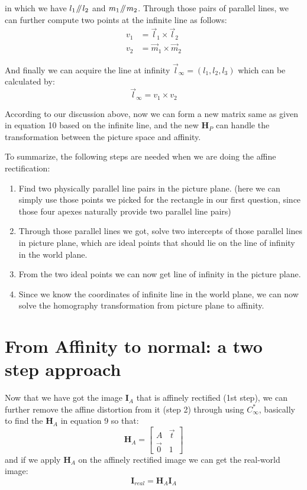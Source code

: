 \documentclass[conference]{IEEEtran}
\let\oldvec\vec
\renewcommand{\vec}[1]{\oldvec{\mathit{#1}}}
\newcommand{\mat}[1]{\mathbf{#1}} %
\newcommand{\parallelsum}{\mathbin{\!/\mkern-5mu/\!}}
\begin{document}
\noindent in which we have $l_1\parallelsum l_2$ and $m_1\parallelsum m_2$. Through those pairs of parallel lines, we can further compute two points at the infinite line as follows:
\begin{equation}
\begin{split}
	v_1 &= \vec{l}_1\times \vec{l}_2\\
	v_2 &= \vec{m}_1 \times \vec{m}_2
\end{split}
\end{equation}

\noindent And finally we can acquire the line at infinity $\vec{l}_{\infty} = (l_1, l_2, l_3)$ which can be calculated by:
\begin{equation}
	\vec{l}_{\infty} = v_1 \times v_2
\end{equation}

\noindent According to our discussion above, now we can form a new matrix same as given in equation 10 based on the infinite line, and the new $\mat{H}_P$ can handle the transformation between the picture space and affinity.

To summarize, the following steps are needed when we are doing the affine rectification:
\begin{enumerate}
	\item Find two physically parallel line pairs in the picture plane. (here we can simply use those points we picked for the rectangle in our first question, since those four apexes naturally provide two parallel line pairs)
	\item Through those parallel lines we got, solve two intercepts of those parallel lines in picture plane, which are ideal points that should lie on the line of infinity in the world plane.
	\item From the two ideal points we can now get line of infinity in the picture plane.
	\item Since we know the coordinates of infinite line in the world plane, we can now solve the homography transformation from picture plane to affinity.
\end{enumerate}

\section{From Affinity to normal: a two step approach}
Now that we have got the image $\mat{I}_A$ that is affinely rectified (1st step), we can further remove the affine distortion from it (step 2) through using $C_{\infty}^*$, basically to find the $\mat{H}_A$ in equation 9 so that:
\begin{equation}
	\mat{H}_A = \begin{bmatrix}
		A & \vec{t} \\
		\vec{0} & 1
	\end{bmatrix}
\end{equation}
and if we apply $\mat{H}_A$ on the affinely rectified image we can get the real-world image:
\begin{equation}
	\mat{I}_{real} = \mat{H}_A\mat{I}_A
\end{equation} 
\end{document}
